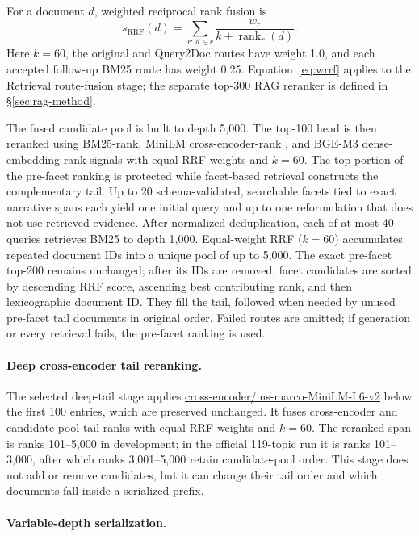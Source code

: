 For a document $d$, weighted reciprocal rank fusion is
\begin{equation}
s_{\mathrm{RRF}}(d) = \sum_{r:\,d\in r} \frac{w_r}{k + \operatorname{rank}_r(d)}.
\label{eq:wrrf}
\end{equation}
Here $k=60$, the original and Query2Doc routes have weight 1.0, and
each accepted follow-up BM25 route has weight 0.25.
Equation~\ref{eq:wrrf} applies to
the Retrieval route-fusion stage; the separate top-300 RAG reranker is
defined in \S\ref{sec:rag-method}.

The fused candidate pool is built to depth 5,000. The top-100 head is
then reranked using BM25-rank, MiniLM cross-encoder-rank
\citep{wang2020minilm}, and BGE-M3 dense-embedding-rank \citep{chen2024bgem3} signals with
equal RRF weights and $k=60$. The top portion of the pre-facet ranking
is protected while facet-based retrieval constructs the complementary
tail. Up to 20 schema-validated, searchable facets tied to exact
narrative spans each yield one initial query and up to one reformulation
that does not use retrieved evidence. After normalized deduplication, each of at most
40 queries retrieves BM25 to depth 1,000. Equal-weight RRF ($k=60$)
accumulates repeated document IDs into a unique pool of up to 5,000.
The exact pre-facet top-200 remains unchanged; after its IDs are removed,
facet candidates are sorted by descending RRF score, ascending best
contributing rank, and then lexicographic document ID. They fill the tail, followed when
needed by unused pre-facet tail documents in original order. Failed routes are omitted; if
generation or every retrieval fails, the pre-facet ranking is used.

\paragraph{Deep cross-encoder tail reranking.}

The selected deep-tail stage applies
\url{cross-encoder/ms-marco-MiniLM-L6-v2} below the first 100
entries, which are preserved unchanged. It fuses cross-encoder and
candidate-pool tail ranks with equal RRF weights and $k=60$. The
reranked span is ranks 101--5,000 in development; in the official
119-topic run it is ranks 101--3,000, after which ranks 3,001--5,000
retain candidate-pool order. This stage does not add or remove
candidates, but it can change their tail order and which documents fall
inside a serialized prefix.

\paragraph{Variable-depth serialization.}

